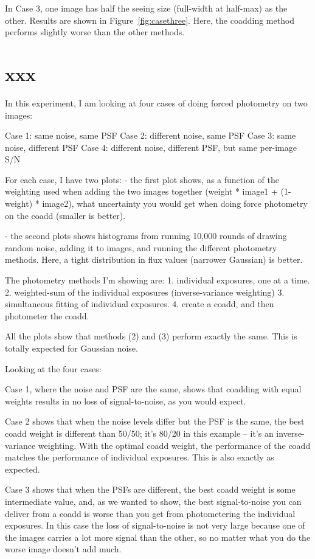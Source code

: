 \documentclass[letter,11pt]{article}
\begin{document}
In Case 3, one image has half the seeing size (full-width at half-max)
as the other.  Results are shown in Figure~\ref{fig:casethree}.
Here, the coadding method performs slightly worse than the other methods.





\section*{xxx}


In this experiment, I am looking at four cases of doing forced photometry on two images:

Case 1: same noise, same PSF
Case 2: different noise, same PSF
Case 3: same noise, different PSF
Case 4: different noise, different PSF, but same per-image S/N

For each case, I have two plots:
- the first plot shows, as a function of the weighting used when adding the two images together (weight * image1 + (1-weight) * image2), what uncertainty you would get when doing force photometry on the coadd (smaller is better).

- the second plots shows histograms from running 10,000 rounds of drawing random noise, adding it to images, and running the different photometry methods.  Here, a tight distribution in flux values (narrower Gaussian) is better.

The photometry methods I'm showing are:
1. individual exposures, one at a time.
2. weighted-sum of the individual exposures (inverse-variance weighting)
3. simultaneous fitting of individual exposures.
4. create a coadd, and then photometer the coadd.

All the plots show that methods (2) and (3) perform exactly the same.  This is totally expected for Gaussian noise.

Looking at the four cases:

Case 1, where the noise and PSF are the same, shows that coadding with equal weights results in no loss of signal-to-noise, as you would expect.

Case 2 shows that when the noise levels differ but the PSF is the same, the best coadd weight is different than 50/50; it's 80/20 in this example -- it's an inverse-variance weighting.  With the optimal coadd weight, the performance of the coadd matches the performance of individual exposures.  This is also exactly as expected.

Case 3 shows that when the PSFs are different, the best coadd weight is some intermediate value, and, as we wanted to show, the best signal-to-noise you can deliver from a coadd is worse than you get from photometering the individual exposures.  In this case the loss of signal-to-noise is not very large because one of the images carries a lot more signal than the other, so no matter what you do the worse image doesn't add much.
\end{document}
